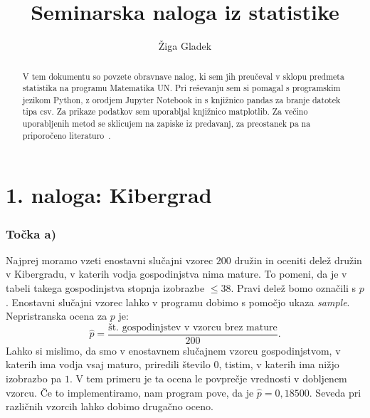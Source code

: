 \documentclass[12pt, letterpaper]{article}
\title{Seminarska naloga iz statistike}
\author{Žiga Gladek}
\begin{document}
\maketitle

\renewcommand{\abstractname}{Povzetek}
\begin{abstract}
V tem dokumentu so povzete obravnave nalog, ki sem jih preučeval v sklopu predmeta statistika na programu Matematika UN. Pri reševanju sem si pomagal s programskim jezikom Python, z orodjem Jupyter Notebook in s knjižnico pandas za branje datotek tipa csv. Za prikaze podatkov sem uporabljal knjižnico matplotlib. Za večino uporabljenih metod se sklicujem na zapiske iz predavanj, za preostanek pa na priporočeno literaturo~\cite{Rice}.
\end{abstract}

\section*{1. naloga: Kibergrad}

\subsubsection*{Točka a)} Najprej moramo vzeti enostavni slučajni vzorec $200$ družin in oceniti delež družin v Kibergradu, v katerih vodja gospodinjstva nima mature. To pomeni, da je v tabeli takega gospodinjstva stopnja izobrazbe $\leq 38$. Pravi delež bomo označili s $p$. Enostavni slučajni vzorec lahko v programu dobimo s pomočjo ukaza \emph{sample}. Nepristranska ocena za $p$ je:
\[
\hat{p} = \frac{\text{št. gospodinjstev v vzorcu brez mature}}{200}.
\]
Lahko si mislimo, da smo v enostavnem slučajnem vzorcu gospodinjstvom, v katerih ima vodja vsaj maturo, priredili število $0$, tistim, v katerih ima nižjo izobrazbo pa $1$. V tem primeru je ta ocena le povprečje vrednosti v dobljenem vzorcu. Če to implementiramo, nam program pove, da je $\hat{p} = 0,18500$. Seveda pri različnih vzorcih lahko dobimo drugačno oceno.
\end{document}
